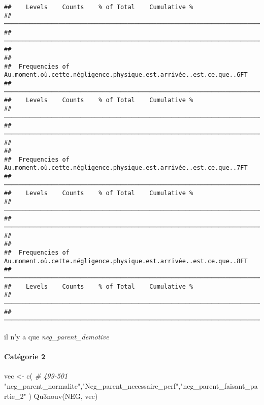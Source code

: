 \documentclass[
]{article}
\newenvironment{Shaded}{\begin{snugshade}}{\end{snugshade}}
\newcommand{\CommentTok}[1]{\textcolor[rgb]{0.56,0.35,0.01}{\textit{#1}}}
\newcommand{\FunctionTok}[1]{\textcolor[rgb]{0.00,0.00,0.00}{#1}}
\newcommand{\NormalTok}[1]{#1}
\newcommand{\OtherTok}[1]{\textcolor[rgb]{0.56,0.35,0.01}{#1}}
\newcommand{\StringTok}[1]{\textcolor[rgb]{0.31,0.60,0.02}{#1}}
\begin{document}
\begin{verbatim}
##    Levels    Counts    % of Total    Cumulative %   
##  ────────────────────────────────────────────────────────────────────────────────── 
##  ────────────────────────────────────────────────────────────────────────────────── 
## 
## 
##  Frequencies of Au.moment.où.cette.négligence.physique.est.arrivée..est.ce.que..6FT 
##  ────────────────────────────────────────────────────────────────────────────────── 
##    Levels    Counts    % of Total    Cumulative %   
##  ────────────────────────────────────────────────────────────────────────────────── 
##  ────────────────────────────────────────────────────────────────────────────────── 
## 
## 
##  Frequencies of Au.moment.où.cette.négligence.physique.est.arrivée..est.ce.que..7FT 
##  ────────────────────────────────────────────────────────────────────────────────── 
##    Levels    Counts    % of Total    Cumulative %   
##  ────────────────────────────────────────────────────────────────────────────────── 
##  ────────────────────────────────────────────────────────────────────────────────── 
## 
## 
##  Frequencies of Au.moment.où.cette.négligence.physique.est.arrivée..est.ce.que..8FT 
##  ────────────────────────────────────────────────────────────────────────────────── 
##    Levels    Counts    % of Total    Cumulative %   
##  ────────────────────────────────────────────────────────────────────────────────── 
##  ──────────────────────────────────────────────────────────────────────────────────
\end{verbatim}

il n'y a que \emph{neg\_parent\_demotive}

\hypertarget{catuxe9gorie-2-6}{%
\paragraph{Catégorie 2}\label{catuxe9gorie-2-6}}

\begin{Shaded}
\begin{Highlighting}[]
\NormalTok{vec }\OtherTok{\textless{}{-}} \FunctionTok{c}\NormalTok{(  }\CommentTok{\# 499{-}501}
  \StringTok{"neg\_parent\_normalite"}\NormalTok{,}\StringTok{"Neg\_parent\_necessaire\_perf"}\NormalTok{,}\StringTok{"neg\_parent\_faisant\_partie\_2"}  
\NormalTok{)}
\FunctionTok{Qu3nouv}\NormalTok{(NEG, vec)}
\end{Highlighting}
\end{Shaded}
\end{document}
